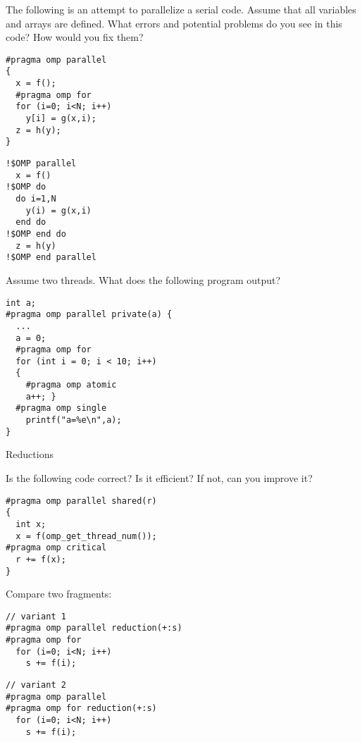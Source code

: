  {}

The following is an attempt to parallelize a serial code.
Assume that all variables and arrays are defined.
What errors and potential problems do you see in this code? How would you fix them?

\begin{multicols}{2}
\lstset{language=C}
\small
\begin{lstlisting}
#pragma omp parallel
{
  x = f();
  #pragma omp for
  for (i=0; i<N; i++)
    y[i] = g(x,i);
  z = h(y);
}
\end{lstlisting}
\columnbreak

\lstset{language=Fortran}
\begin{lstlisting}
!$OMP parallel
  x = f()
!$OMP do
  do i=1,N
    y(i) = g(x,i)
  end do
!$OMP end do 
  z = h(y)
!$OMP end parallel
\end{lstlisting}
\end{multicols}


\vfill\pagebreak

 {}

Assume two threads. What does the following program output?

\begin{lstlisting}
int a;
#pragma omp parallel private(a) {
  ...
  a = 0;
  #pragma omp for
  for (int i = 0; i < 10; i++)
  {
    #pragma omp atomic
    a++; }
  #pragma omp single
    printf("a=%e\n",a);
}
\end{lstlisting}

 {Reductions}

 {}

Is the following code correct? Is it efficient? If not, can you improve it?
\begin{verbatim}
#pragma omp parallel shared(r)
{
  int x;
  x = f(omp_get_thread_num());
#pragma omp critical
  r += f(x);
}
\end{verbatim}

 {}

Compare two fragments:
\begin{multicols}{2}
\lstset{language=C}
\begin{lstlisting}
// variant 1
#pragma omp parallel reduction(+:s)
#pragma omp for
  for (i=0; i<N; i++)
    s += f(i);
\end{lstlisting}
\columnbreak
\begin{lstlisting}
// variant 2
#pragma omp parallel 
#pragma omp for reduction(+:s)
  for (i=0; i<N; i++)
    s += f(i);
\end{lstlisting}
\end{multicols}

